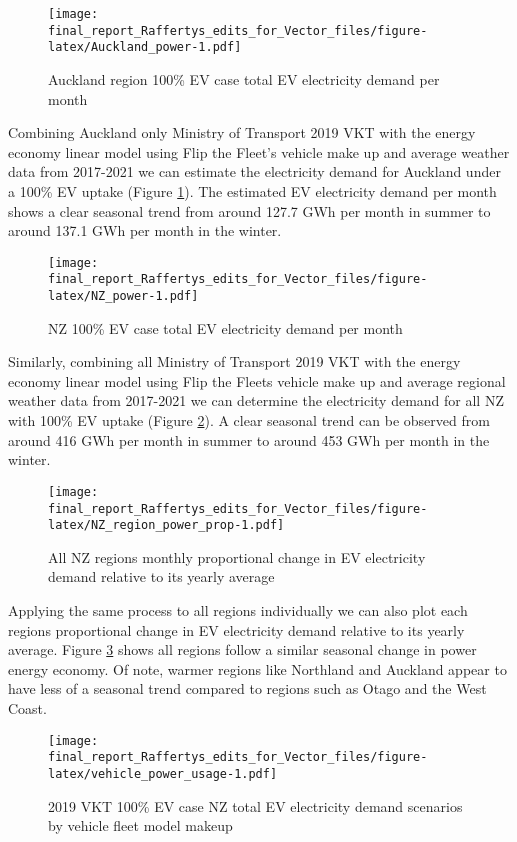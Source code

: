 \documentclass[
]{article}
\begin{document}
\begin{figure}
\centering
\texttt{[image: final\_report\_Raffertys\_edits\_for\_Vector\_files/figure-latex/Auckland\_power-1.pdf]}
\caption{Auckland region 100\% EV case total EV electricity demand per
month\label{fig:Auckland_power}}
\end{figure}

Combining Auckland only Ministry of Transport 2019 VKT with the energy
economy linear model using Flip the Fleet's vehicle make up and average
weather data from 2017-2021 we can estimate the electricity demand for
Auckland under a 100\% EV uptake (Figure \ref{fig:Auckland_power}). The
estimated EV electricity demand per month shows a clear seasonal trend
from around 127.7 GWh per month in summer to around 137.1 GWh per month
in the winter.

\begin{figure}
\centering
\texttt{[image: final\_report\_Raffertys\_edits\_for\_Vector\_files/figure-latex/NZ\_power-1.pdf]}
\caption{NZ 100\% EV case total EV electricity demand per
month\label{fig:NZ_power}}
\end{figure}

Similarly, combining all Ministry of Transport 2019 VKT with the energy
economy linear model using Flip the Fleets vehicle make up and average
regional weather data from 2017-2021 we can determine the electricity
demand for all NZ with 100\% EV uptake (Figure \ref{fig:NZ_power}). A
clear seasonal trend can be observed from around 416 GWh per month in
summer to around 453 GWh per month in the winter.

\begin{figure}
\centering
\texttt{[image: final\_report\_Raffertys\_edits\_for\_Vector\_files/figure-latex/NZ\_region\_power\_prop-1.pdf]}
\caption{All NZ regions monthly proportional change in EV electricity
demand relative to its yearly average\label{fig:NZ_region_power_prop}}
\end{figure}

Applying the same process to all regions individually we can also plot
each regions proportional change in EV electricity demand relative to
its yearly average. Figure \ref{fig:NZ_region_power_prop} shows all
regions follow a similar seasonal change in power energy economy. Of
note, warmer regions like Northland and Auckland appear to have less of
a seasonal trend compared to regions such as Otago and the West Coast.

\begin{figure}
\centering
\texttt{[image: final\_report\_Raffertys\_edits\_for\_Vector\_files/figure-latex/vehicle\_power\_usage-1.pdf]}
\caption{2019 VKT 100\% EV case NZ total EV electricity demand scenarios
by vehicle fleet model makeup\label{fig:vehicle_power_usage}}
\end{figure}
\end{document}
